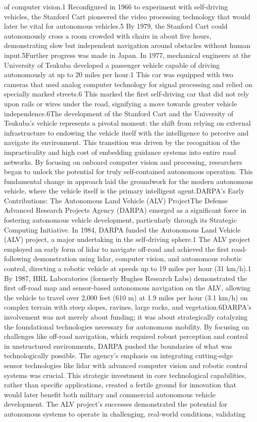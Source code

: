 of computer vision.1 Reconfigured in 1966 to experiment with self-driving vehicles, the Stanford Cart pioneered the video processing technology that would later be vital for autonomous vehicles.5 By 1979, the Stanford Cart could autonomously cross a room crowded with chairs in about five hours, demonstrating slow but independent navigation around obstacles without human input.5Further progress was made in Japan. In 1977, mechanical engineers at the University of Tsukuba developed a passenger vehicle capable of driving autonomously at up to 20 miles per hour.1 This car was equipped with two cameras that used analog computer technology for signal processing and relied on specially marked streets.6 This marked the first self-driving car that did not rely upon rails or wires under the road, signifying a move towards greater vehicle independence.6The development of the Stanford Cart and the University of Tsukuba's vehicle represents a pivotal moment: the shift from relying on external infrastructure to endowing the vehicle itself with the intelligence to perceive and navigate its environment. This transition was driven by the recognition of the impracticality and high cost of embedding guidance systems into entire road networks. By focusing on onboard computer vision and processing, researchers began to unlock the potential for truly self-contained autonomous operation. This fundamental change in approach laid the groundwork for the modern autonomous vehicle, where the vehicle itself is the primary intelligent agent.DARPA's Early Contributions: The Autonomous Land Vehicle (ALV) ProjectThe Defense Advanced Research Projects Agency (DARPA) emerged as a significant force in fostering autonomous vehicle development, particularly through its Strategic Computing Initiative. In 1984, DARPA funded the Autonomous Land Vehicle (ALV) project, a major undertaking in the self-driving sphere.1 The ALV project employed an early form of lidar to navigate off-road and achieved the first road-following demonstration using lidar, computer vision, and autonomous robotic control, directing a robotic vehicle at speeds up to 19 miles per hour (31 km/h).1 By 1987, HRL Laboratories (formerly Hughes Research Labs) demonstrated the first off-road map and sensor-based autonomous navigation on the ALV, allowing the vehicle to travel over 2,000 feet (610 m) at 1.9 miles per hour (3.1 km/h) on complex terrain with steep slopes, ravines, large rocks, and vegetation.6DARPA's involvement was not merely about funding; it was about strategically catalyzing the foundational technologies necessary for autonomous mobility. By focusing on challenges like off-road navigation, which required robust perception and control in unstructured environments, DARPA pushed the boundaries of what was technologically possible. The agency's emphasis on integrating cutting-edge sensor technologies like lidar with advanced computer vision and robotic control systems was crucial. This strategic investment in core technological capabilities, rather than specific applications, created a fertile ground for innovation that would later benefit both military and commercial autonomous vehicle development. The ALV project's successes demonstrated the potential for autonomous systems to operate in challenging, real-world conditions, validating 